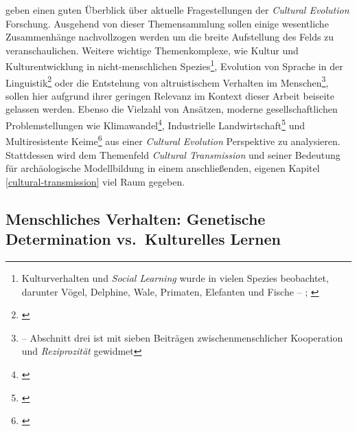 \documentclass[openany,twoside,twocolumn]{book}
\let\rmarkdownfootnote\footnote%
\def\footnote{\protect\rmarkdownfootnote}
\begin{document}
\textcite{creanza_cultural_2017} geben einen guten Überblick über aktuelle Fragestellungen der \emph{Cultural Evolution} Forschung. Ausgehend von dieser Themensammlung sollen einige wesentliche Zusammenhänge nachvollzogen werden um die breite Aufstellung des Felds zu veranschaulichen. Weitere wichtige Themenkomplexe, wie Kultur und Kulturentwicklung in nicht-menschlichen Spezies\footnote{Kulturverhalten und \emph{Social Learning} wurde in vielen Spezies beobachtet, darunter Vögel, Delphine, Wale, Primaten, Elefanten und Fische -- \textcite{eerkens_cultural_2007}; \textcite{laland_question_2009}}, Evolution von Sprache in der Linguistik\footnote{\textcite{nowak_evolution_1999}} oder die Entstehung von altruistischem Verhalten im Menschen\footnote{\textcite{boyd_origin_2005} -- Abschnitt drei ist mit sieben Beiträgen zwischenmenschlicher Kooperation und \emph{Reziprozität} gewidmet}, sollen hier aufgrund ihrer geringen Relevanz im Kontext dieser Arbeit beiseite gelassen werden. Ebenso die Vielzahl von Ansätzen, moderne gesellschaftlichen Problemstellungen wie Klimawandel\footnote{\textcite{seneviratne_allowable_2016}}, Industrielle Landwirtschaft\footnote{\textcite{garibaldi_farming_2017}} und Multiresistente Keime\footnote{\textcite{boni_evolution_2005}} aus einer \emph{Cultural Evolution} Perspektive zu analysieren. Stattdessen wird dem Themenfeld \emph{Cultural Transmission} und seiner Bedeutung für archäologische Modellbildung in einem anschließenden, eigenen Kapitel \ref{cultural-transmission} viel Raum gegeben.

\hypertarget{menschliches-verhalten-genetische-determination-vs.kulturelles-lernen}{%
\subsection{Menschliches Verhalten: Genetische Determination vs.~Kulturelles Lernen}\label{menschliches-verhalten-genetische-determination-vs.kulturelles-lernen}}
\end{document}
